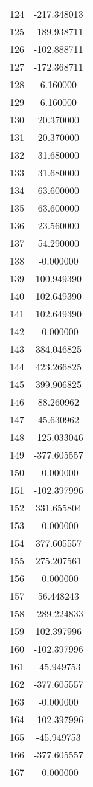 \documentclass[12pt]{article}
\begin{document}
\begin{longtable}{@{}cc@{}}
124 & -217.348013 \\
125 & -189.938711 \\
126 & -102.888711 \\
127 & -172.368711 \\
128 & 6.160000 \\
129 & 6.160000 \\
130 & 20.370000 \\
131 & 20.370000 \\
132 & 31.680000 \\
133 & 31.680000 \\
134 & 63.600000 \\
135 & 63.600000 \\
136 & 23.560000 \\
137 & 54.290000 \\
138 & -0.000000 \\
139 & 100.949390 \\
140 & 102.649390 \\
141 & 102.649390 \\
142 & -0.000000 \\
143 & 384.046825 \\
144 & 423.266825 \\
145 & 399.906825 \\
146 & 88.260962 \\
147 & 45.630962 \\
148 & -125.033046 \\
149 & -377.605557 \\
150 & -0.000000 \\
151 & -102.397996 \\
152 & 331.655804 \\
153 & -0.000000 \\
154 & 377.605557 \\
155 & 275.207561 \\
156 & -0.000000 \\
157 & 56.448243 \\
158 & -289.224833 \\
159 & 102.397996 \\
160 & -102.397996 \\
161 & -45.949753 \\
162 & -377.605557 \\
163 & -0.000000 \\
164 & -102.397996 \\
165 & -45.949753 \\
166 & -377.605557 \\
167 & -0.000000 \\

\end{longtable}
\end{document}
